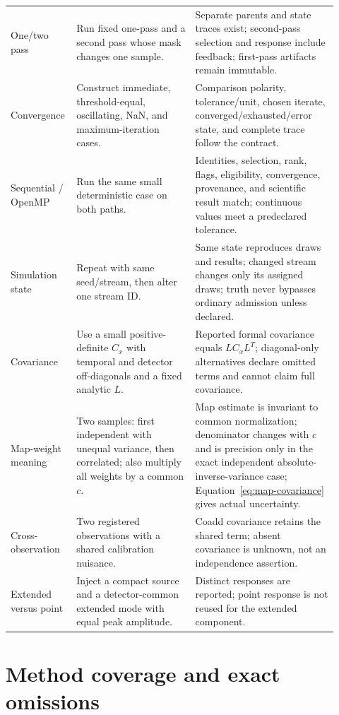 \documentclass[11pt]{article}
\begin{document}
\begin{longtable}{>{\raggedright\arraybackslash}p{0.15\linewidth}
                  >{\raggedright\arraybackslash}p{0.35\linewidth}
                  >{\raggedright\arraybackslash}p{0.42\linewidth}}
One/two pass & Run fixed one-pass and a second pass whose mask changes one
sample. & Separate parents and state traces exist; second-pass selection and
response include feedback; first-pass artifacts remain immutable.\\
Convergence & Construct immediate, threshold-equal, oscillating, NaN, and
maximum-iteration cases. & Comparison polarity, tolerance/unit, chosen iterate,
converged/exhausted/error state, and complete trace follow the contract.\\
Sequential / OpenMP & Run the same small deterministic case on both paths. &
Identities, selection, rank, flags, eligibility, convergence, provenance, and
scientific result match; continuous values meet a predeclared tolerance.\\
Simulation state & Repeat with same seed/stream, then alter one stream ID. &
Same state reproduces draws and results; changed stream changes only its
assigned draws; truth never bypasses ordinary admission unless declared.\\
Covariance & Use a small positive-definite $C_x$ with temporal and detector
off-diagonals and a fixed analytic $L$. & Reported formal covariance equals
$LC_xL^T$; diagonal-only alternatives declare omitted terms and cannot claim
full covariance.\\
Map-weight meaning & Two samples: first independent with unequal variance,
then correlated; also multiply all weights by a common $c$. & Map estimate is
invariant to common normalization; denominator changes with $c$ and is
precision only in the exact independent absolute-inverse-variance case;
Equation~\eqref{eq:map-covariance} gives actual uncertainty.\\
Cross-observation & Two registered observations with a shared calibration
nuisance. & Coadd covariance retains the shared term; absent covariance is
unknown, not an independence assertion.\\
Extended versus point & Inject a compact source and a detector-common extended
mode with equal peak amplitude. & Distinct responses are reported; point
response is not reused for the extended component.\\
\bottomrule
\end{longtable}
\normalsize

\section{Method coverage and exact omissions}
\label{sec:methods}
\end{document}

